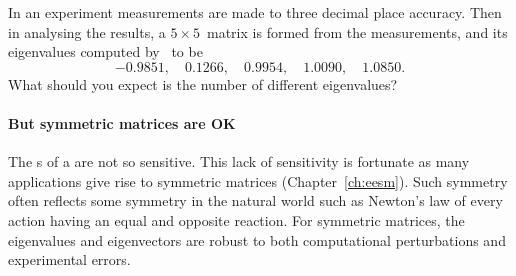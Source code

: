 \begin{example}
\begin{enumerate}
\end{enumerate}
\end{example}






\begin{activity}
In an experiment measurements are made to three decimal place accuracy.
Then in analysing the results, a \(5\times5\)~matrix is formed from the measurements, and its eigenvalues computed by \script\ to be
\begin{equation*}
-0.9851,\quad
0.1266,\quad
0.9954,\quad
1.0090,\quad
1.0850.
\end{equation*}
What should you expect is the number of different eigenvalues?
\end{activity}









\paragraph{But symmetric matrices are OK}
The s of a  are not so sensitive.
This lack of sensitivity is fortunate as many applications give rise to symmetric matrices (Chapter~\ref{ch:eesm}).
Such symmetry often reflects some symmetry in the natural world such as Newton's law of every action having an equal and opposite reaction.
For symmetric matrices, the eigenvalues and eigenvectors are robust to both computational perturbations and experimental errors.




